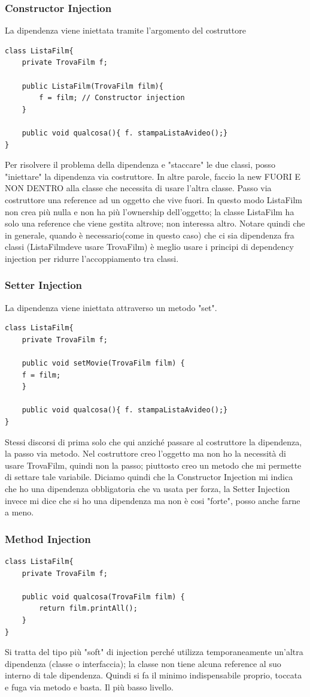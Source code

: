 \subsubsection{Constructor Injection}
La dipendenza viene iniettata tramite l’argomento del costruttore
\begin{lstlisting}
class ListaFilm{
	private TrovaFilm f;

	public ListaFilm(TrovaFilm film){
		f = film; // Constructor injection
	}

	public void qualcosa(){ f. stampaListaAvideo();}
}
\end{lstlisting}
Per risolvere il problema della dipendenza e "staccare" le due classi, posso "iniettare" la dipendenza via costruttore. In altre parole, faccio la new FUORI E NON DENTRO alla classe che necessita di usare l’altra classe. Passo via costruttore una reference ad un oggetto che vive fuori. In questo modo ListaFilm non crea più nulla e non ha più l’ownership dell’oggetto; la classe ListaFilm ha solo una reference che viene gestita altrove; non interessa altro. Notare quindi che in generale, quando è necessario(come in questo caso) che ci sia dipendenza fra classi (ListaFilmdeve usare TrovaFilm) è meglio usare i principi di dependency injection per ridurre l’accoppiamento tra classi.

\subsubsection{Setter Injection}
La dipendenza viene iniettata attraverso un metodo "set".
\begin{lstlisting}
class ListaFilm{
	private TrovaFilm f;

	public void setMovie(TrovaFilm film) {
	f = film;
	}

	public void qualcosa(){ f. stampaListaAvideo();}
}
\end{lstlisting}
Stessi discorsi di prima solo che qui anziché passare al costruttore la dipendenza, la passo via metodo. Nel costruttore creo l'oggetto ma non ho la necessità di usare TrovaFilm, quindi non la passo; piuttosto creo un metodo che mi permette di settare tale variabile. Diciamo quindi che la Constructor Injection mi indica che ho una dipendenza obbligatoria che va usata per forza, la Setter Injection invece mi dice che si ho una dipendenza ma non è cosi "forte", posso anche farne a meno.

\subsubsection{Method Injection}
\begin{lstlisting}
class ListaFilm{
	private TrovaFilm f;

	public void qualcosa(TrovaFilm film) {
		return film.printAll();
	}
}
\end{lstlisting}
Si tratta del tipo più "soft" di injection perché utilizza temporaneamente un'altra dipendenza (classe o interfaccia); la classe non tiene alcuna reference al suo interno di tale dipendenza. Quindi si fa il minimo indispensabile proprio, toccata e fuga via metodo e basta. Il più basso livello.

